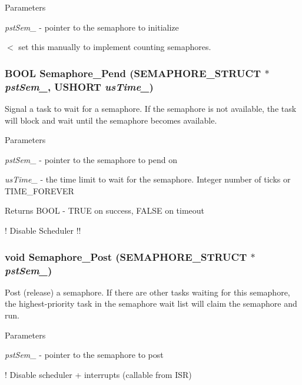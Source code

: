 \begin{DoxyParams}{Parameters}
\item[{\em pstSem\_\-}]-\/ pointer to the semaphore to initialize \end{DoxyParams}


$<$ set this manually to implement counting semaphores. 
\subsubsection[{Semaphore\_\-Pend}]{\setlength{\rightskip}{0pt plus 5cm}BOOL Semaphore\_\-Pend ({\bf SEMAPHORE\_\-STRUCT} $\ast$ {\em pstSem\_\-}, \/  USHORT {\em usTime\_\-})}\label{semaphore_8h_ab4eb90b61e72043afa2a222ce5831083}
Signal a task to wait for a semaphore. If the semaphore is not available, the task will block and wait until the semaphore becomes available.


\begin{DoxyParams}{Parameters}
\item[{\em pstSem\_\-}]-\/ pointer to the semaphore to pend on \item[{\em usTime\_\-}]-\/ the time limit to wait for the semaphore. Integer number of ticks or TIME\_\-FOREVER \end{DoxyParams}
\begin{DoxyReturn}{Returns}
BOOL -\/ TRUE on success, FALSE on timeout 
\end{DoxyReturn}


! Disable Scheduler !! 
\subsubsection[{Semaphore\_\-Post}]{\setlength{\rightskip}{0pt plus 5cm}void Semaphore\_\-Post ({\bf SEMAPHORE\_\-STRUCT} $\ast$ {\em pstSem\_\-})}\label{semaphore_8h_a40737d75283297a93d8364edee0dc56f}
Post (release) a semaphore. If there are other tasks waiting for this semaphore, the highest-\/priority task in the semaphore wait list will claim the semaphore and run.


\begin{DoxyParams}{Parameters}
\item[{\em pstSem\_\-}]-\/ pointer to the semaphore to post \end{DoxyParams}


! Disable scheduler + interrupts (callable from ISR) 